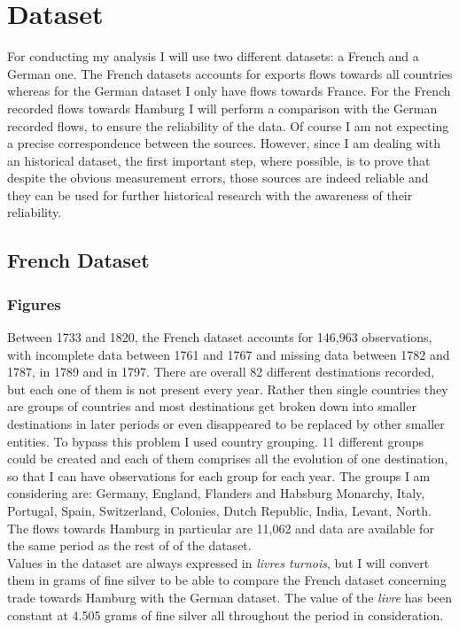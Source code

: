 \documentclass[12pt,a4paper,titlepage,english]{article}
\begin{document}
\section{Dataset}
For conducting my analysis I will use two different datasets: a French and a German one. The French datasets accounts for exports flows towards all countries whereas for the German dataset I only have flows towards France. For the French recorded flows towards Hamburg I will perform a comparison with the German recorded flows, to ensure the reliability of the data. Of course I am not expecting a precise correspondence between the sources. However, since I am dealing with an historical dataset, the first important step, where possible, is to prove that despite the obvious measurement errors, those sources are indeed reliable and they can be used for further historical research with the awareness of their reliability. 

\subsection{French Dataset}
\subsubsection{Figures}
Between 1733 and 1820, the French dataset accounts for 146,963 observations, with incomplete data between 1761 and 1767 and missing data between 1782 and 1787, in 1789 and in 1797. There are overall 82 different destinations recorded, but each one of them is not present every year. Rather then single countries they are groups of countries and most destinations get broken down into smaller destinations in later periods or even disappeared to be replaced by other smaller entities. To bypass this problem I used country grouping. 11 different groups could be created and each of them comprises all the evolution of one destination, so that I can have observations for each group for each year. The groups I am considering are: Germany, England, Flanders and Habsburg Monarchy, Italy, Portugal, Spain, Switzerland, Colonies, Dutch Republic, India, Levant, North. The flows towards Hamburg in particular are 11,062 and data are available for the same period as the rest of of the dataset.\\
Values in the dataset are always expressed in \textit{livres turnois}, but I will convert them in grams of fine silver to be able to compare the French dataset concerning trade towards Hamburg with the German dataset. The value of the \textit{livre} has been constant at 4.505 grams of fine silver all throughout the period in consideration. 
\end{document}
